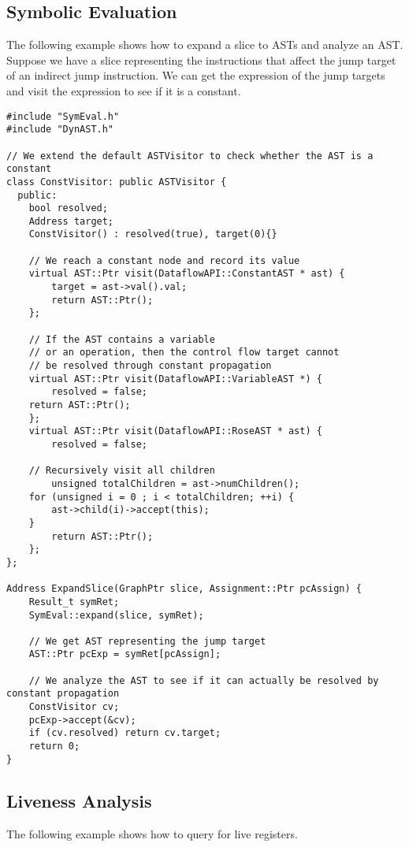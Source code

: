\subsection{Symbolic Evaluation}
The following example shows how to expand a slice to ASTs and analyze an AST.
Suppose we have a slice representing the instructions that affect the jump
target of an indirect jump instruction.
We can get the expression of the jump targets and visit the expression to see if it
is a constant. 

\lstset{numbers=left, numberstyle=\tiny, stepnumber=5, numbersep=5pt}
\lstset{showstringspaces=false}
\begin{lstlisting}
#include "SymEval.h"
#include "DynAST.h"

// We extend the default ASTVisitor to check whether the AST is a constant
class ConstVisitor: public ASTVisitor {
  public:
    bool resolved;
    Address target;
    ConstVisitor() : resolved(true), target(0){}

    // We reach a constant node and record its value
    virtual AST::Ptr visit(DataflowAPI::ConstantAST * ast) {
        target = ast->val().val;
        return AST::Ptr();
    };

    // If the AST contains a variable 
    // or an operation, then the control flow target cannot
    // be resolved through constant propagation
    virtual AST::Ptr visit(DataflowAPI::VariableAST *) {
        resolved = false;
	return AST::Ptr();
    };
    virtual AST::Ptr visit(DataflowAPI::RoseAST * ast) {
        resolved = false;

	// Recursively visit all children
        unsigned totalChildren = ast->numChildren();
	for (unsigned i = 0 ; i < totalChildren; ++i) {
	    ast->child(i)->accept(this);
	}
        return AST::Ptr();
    };
};

Address ExpandSlice(GraphPtr slice, Assignment::Ptr pcAssign) {
    Result_t symRet;
    SymEval::expand(slice, symRet);

    // We get AST representing the jump target
    AST::Ptr pcExp = symRet[pcAssign];

    // We analyze the AST to see if it can actually be resolved by constant propagation
    ConstVisitor cv;
    pcExp->accept(&cv);
    if (cv.resolved) return cv.target;
    return 0;
}

\end{lstlisting}

\subsection{Liveness Analysis}
The following example shows how to query for live registers.

